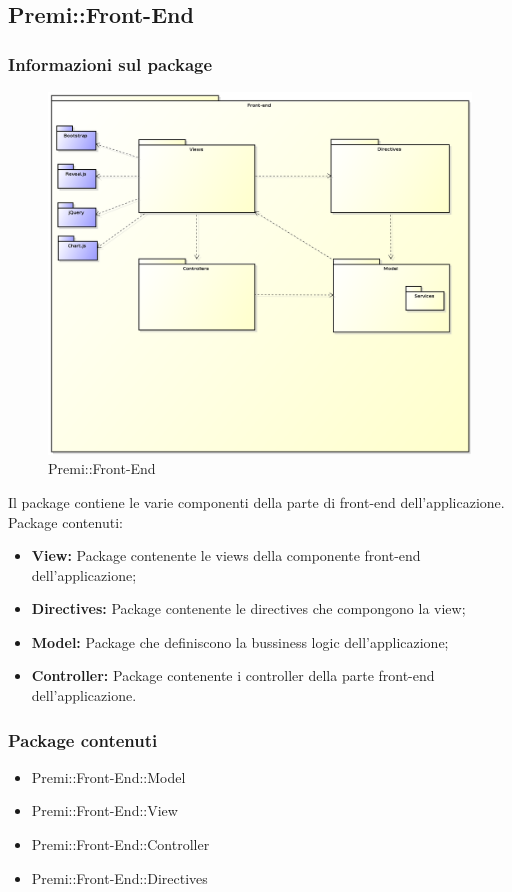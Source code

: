 \subsection{Premi::Front-End}
	\subsubsection{Informazioni sul package}
		\begin{figure}[h]
			\centering
			\includegraphics[width=\linewidth]{img/front-end-package}
			\caption[Premi::Front-End]{Premi::Front-End}
		\end{figure}
		Il package contiene le varie componenti della parte di front-end dell'applicazione.
		\\Package contenuti:
		\begin{itemize}
			\item \textbf{View:} Package contenente le views della componente front-end dell'applicazione;
			\item \textbf{Directives:} Package contenente le directives che compongono la view;
			\item \textbf{Model:} Package che definiscono la bussiness logic dell'applicazione;
			\item \textbf{Controller:} Package contenente i controller della parte front-end dell'applicazione.
		\end{itemize}
	\subsubsection{Package contenuti}
		\begin{itemize}
			\item Premi::Front-End::Model
			\item Premi::Front-End::View
			\item Premi::Front-End::Controller
			\item Premi::Front-End::Directives
		\end{itemize}
